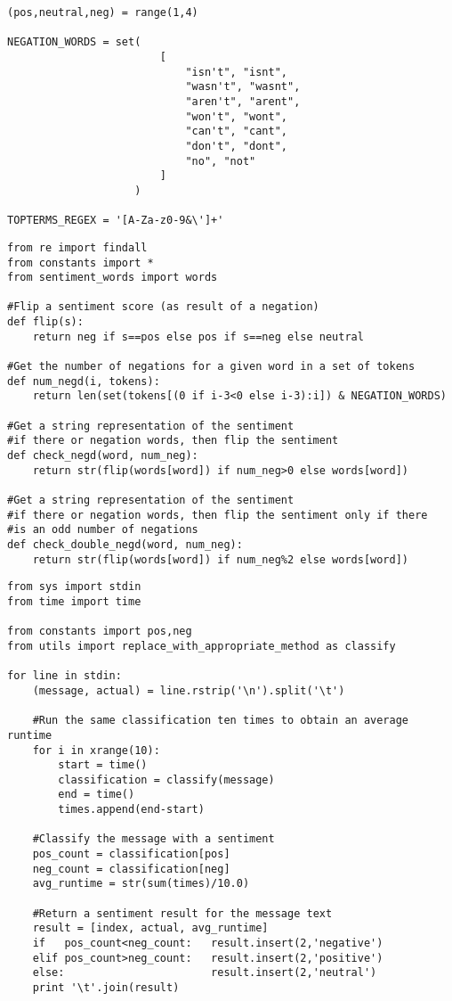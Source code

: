 	\newpage
	\begin{lstlisting}[caption={\textit{constants.py}: sentiment constants}, label=lst:constants]
(pos,neutral,neg) = range(1,4)

NEGATION_WORDS = set(
                        [   
                            "isn't", "isnt",
                            "wasn't", "wasnt",
                            "aren't", "arent",
                            "won't", "wont",
                            "can't", "cant",
                            "don't", "dont",
                            "no", "not"
                        ]   
                    )   

TOPTERMS_REGEX = '[A-Za-z0-9&\']+'
	\end{lstlisting}
	
	\begin{lstlisting}[caption={\textit{utils.py}: helper functions for the mapper}]
from re import findall
from constants import *
from sentiment_words import words

#Flip a sentiment score (as result of a negation)
def flip(s):
    return neg if s==pos else pos if s==neg else neutral

#Get the number of negations for a given word in a set of tokens
def num_negd(i, tokens):
    return len(set(tokens[(0 if i-3<0 else i-3):i]) & NEGATION_WORDS)

#Get a string representation of the sentiment
#if there or negation words, then flip the sentiment
def check_negd(word, num_neg):
    return str(flip(words[word]) if num_neg>0 else words[word])

#Get a string representation of the sentiment
#if there or negation words, then flip the sentiment only if there
#is an odd number of negations
def check_double_negd(word, num_neg):
    return str(flip(words[word]) if num_neg%2 else words[word])
	\end{lstlisting}
	
	\newpage
	\begin{lstlisting}[caption={\textit{mapper.py}: the mapper}]
from sys import stdin
from time import time

from constants import pos,neg
from utils import replace_with_appropriate_method as classify

for line in stdin:
    (message, actual) = line.rstrip('\n').split('\t')

    #Run the same classification ten times to obtain an average runtime
    for i in xrange(10):
        start = time()
        classification = classify(message)
        end = time()
        times.append(end-start)
    
    #Classify the message with a sentiment
    pos_count = classification[pos]
    neg_count = classification[neg]
    avg_runtime = str(sum(times)/10.0)

    #Return a sentiment result for the message text
    result = [index, actual, avg_runtime]
    if   pos_count<neg_count:   result.insert(2,'negative') 
    elif pos_count>neg_count:   result.insert(2,'positive') 
    else:                       result.insert(2,'neutral') 
    print '\t'.join(result)
	\end{lstlisting}

